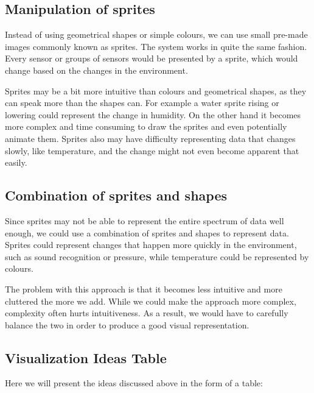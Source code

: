 \documentclass[../document.tex]{subfiles}
\begin{document}
\subsection*{Manipulation of sprites}
Instead of using geometrical shapes or simple colours, we can use small pre-made images commonly known as sprites. The system works in quite the same fashion. Every sensor or groups of sensors would be presented by a sprite, which would change based on the changes in the environment.

Sprites may be a bit more intuitive than colours and geometrical shapes, as they can speak more than the shapes can. For example a water sprite rising or lowering could represent the change in humidity. On the other hand it becomes more complex and time consuming to draw the sprites and even potentially animate them. Sprites also may have difficulty representing data that changes slowly, like temperature, and the change might not even become apparent that easily.

\subsection*{Combination of sprites and shapes}
Since sprites may not be able to represent the entire spectrum of data well enough, we could use a combination of sprites and shapes to represent data. Sprites could represent changes that happen more quickly in the environment, such as sound recognition or pressure, while temperature could be represented by colours.

The problem with this approach is that it becomes less intuitive and more cluttered the more we add. While we could make the approach more complex, complexity often hurts intuitiveness. As a result, we would have to carefully balance the two in order to produce a good visual representation.

\subsection*{Visualization Ideas Table}
Here we will present the ideas discussed above in the form of a table:
\end{document}
